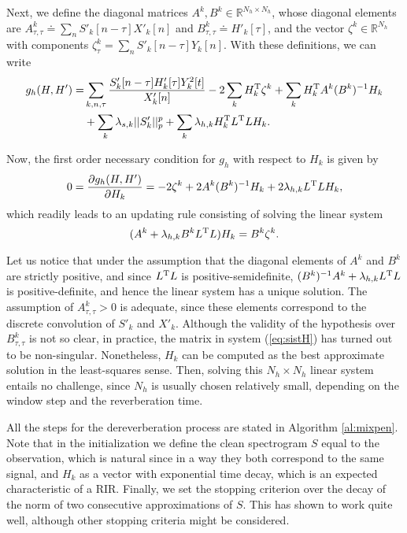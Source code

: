 \documentclass[12pt]{article}
\newcommand{\T}{^{\text{\scriptsize{T}}}}
\begin{document}
Next, we define the diagonal matrices $A^k,B^k\in\mathbb{R}^{N_h\times N_h}$, whose diagonal elements are $A^k_{\tau,\tau} \doteq \sum_{n}S'_k[n-\tau]X'_k[n]$ and $B^k_{\tau,\tau} \doteq H'_k[\tau]$, and the vector  $\zeta^k\in\mathbb{R}^{N_h}$ with components $\zeta^k_\tau=\sum_{n}S'_k[n-\tau]Y_k[n]$. With these definitions, we can write
%
\begin{align}\nonumber
g_h(H,H') = &\sum_{k,n,\tau} \frac{S'_k[n-\tau]H'_k[\tau]Y_k^2[t]}{X'_k[n]} -2\sum_k H_k\T  \zeta^k +\sum_k H_k\T  A^k(B^k)^{-1}H_k\\ \nonumber
&+\sum_{k}\lambda_{s,k} ||S'_k||_p^p +\sum_{k} \lambda_{h,k}H_k\T  L\T  LH_k.
\end{align}

Now, the first order necessary condition for $g_h$ with respect to $H_k$ is given by
%
\begin{align}
0 = \frac{\partial g_h(H,H')}{\partial H_k}  = -2 \zeta^k +2A^k(B^k)^{-1}H_k  +2 \lambda_{h,k}L\T  LH_k,
\end{align}
%
which readily leads to an updating rule consisting of solving the linear system
%
\begin{equation} \label{eq:sistH}
(A^k+\lambda_{h,k}B^kL\T L)H_k = B^k\zeta^k.
\end{equation}

Let us notice that under the assumption that the diagonal elements of $A^k$ and $B^k$ are strictly positive, and since $L\T L$ is positive-semidefinite, $(B^k)^{-1}A^k +\lambda_{h,k}L\T L$ is positive-definite, and hence the linear system has a unique solution. The assumption of $A^k_{\tau,\tau}>0$ is adequate, since these elements correspond to the discrete convolution of $S'_k$ and $X'_k$. Although the validity of the hypothesis over $B^k_{\tau,\tau}$ is not so clear, in practice, the matrix in system (\ref{eq:sistH}) has turned out to be non-singular. Nonetheless, $H_k$ can be computed as the best approximate solution in the least-squares sense. Then, solving this $N_h\times  N_h$  linear system entails no challenge, since $N_h$ is usually chosen relatively small, depending on the window step and the reverberation time.

All the steps for the dereverberation process are stated in Algorithm \ref{al:mixpen}. Note that in the initialization we define the clean spectrogram $S$ equal to the observation, which is natural since in a way they both correspond to the same signal, and $H_k$ as a vector with exponential time decay, which is an expected characteristic of a RIR. Finally, we set the stopping criterion over the decay of the norm of two consecutive approximations of $S$. This has shown to work quite well, although other stopping criteria might be considered.
\end{document}
